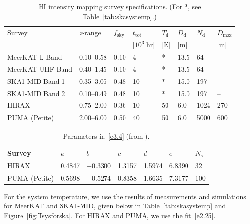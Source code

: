 \begin{table}[ht]
\footnotesize
\centering
\caption{\label{tab:hisurveyspecs} HI intensity mapping survey specifications. 
(For *, see Table~\ref{tab:skasystemp}.)} 
\vspace*{0.2cm}
\begin{tabular}{| p{3.4cm} p{1.2cm} p{0.5cm} p{0.2cm} p{0.2cm} p{0.4cm} p{0.4cm} p{0.4cm} |} \hline
Survey & $z$-range & $f_\mathrm{sky}$ & $t_{\mathrm{tot}}$  & $T_{\mathrm{d}}$ & $D_\mathrm{d}$ & $N_\mathrm{d}$ & $D_\mathrm{max}$ \\
&  & & [$10^{3}$ hr] & [K]  & [m] & & {[m]} \\
\hline\hline 
MeerKAT L Band   & 0.10--0.58 & 0.10 & 4  & * & 13.5 & 64 & -- \\
MeerKAT UHF Band & 0.40--1.45 & 0.10 & 4  & * & 13.5 & 64  & --  \\
SKA1-MID Band 1  & 0.35--3.05 & 0.48 & 10 & * & 15.0 & 197  & --  \\
SKA1-MID Band 2  & 0.10--0.49 & 0.48 & 10 & * & 15.0 & 197  & --  \\
HIRAX            & 0.75--2.00 & 0.36 & 10 & 50 & 6.0  & 1024  & 270\\
PUMA (Petite)    & 2.00--6.00 & 0.50 & 40 & 50 & 6.0  & 5000 & 600 \\
\hline
\end{tabular}
\end{table}

\vspace*{-0.5cm}
\begin{table}[ht]
\centering
\caption{\label{tab2} Parameters in~\eqref{e3.4} (from \cite{Ansari:2018ury}).} 
\vspace*{0.2cm}
\begin{tabular}{| p{3.4cm} p{0.7cm} p{0.7cm} p{0.7cm} p{0.7cm} p{0.7cm} p{0.5cm} |} \hline
Survey & $a$ & $b$ & $c$  & $d$ & $e$ & $N_\mathrm{s}$  \\ \hline\hline 
HIRAX & 0.4847 & $-0.3300$ & 1.3157 & 1.5974 & 6.8390 & 32  \\
PUMA (Petite) & 0.5698 & $-0.5274$ & 0.8358 & 1.6635 & 7.3177 & {100} \\
\hline
\end{tabular}
\end{table}

For the system temperature, we use the results of measurements and simulations for MeerKAT and SKA1-MID, given below in Table~\ref{tab:skasystemp} and Figure~\ref{fig:Tsysforska}. For HIRAX and PUMA, we use the fit~\eqref{e2.25}. 

